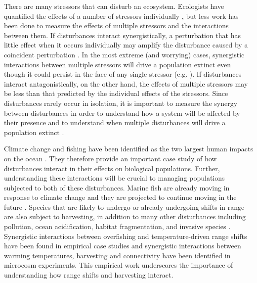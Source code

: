 \documentclass[12pt,english]{article}
\begin{document}
\begin{spacing}{1.9}
\begin{flushleft}
There are many stressors that can disturb an ecosystem. Ecologists have quantified the effects of a number of stressors individually \citep{Wilcoveetal1998, Crainetal2008, DarlingCote2008}, but less work has been done to measure the effects of multiple stressors and the interactions between them.  If disturbances interact synergistically, a perturbation that has little effect when it occurs individually may amplify the disturbance caused by a coincident perturbation \citep{Crainetal2008, DarlingCote2008,Nyeetal2013,Gurevitchetal2000}.   In the most extreme (and worrying) cases, synergistic interactions between multiple stressors will drive a population extinct even though it could persist in the face of any single stressor (e.g. \citet{Pelletieretal2006}).  If disturbances interact antagonistically, on the other hand, the effects of multiple stressors may be less than that predicted by the individual effects of the stressors.  Since disturbances rarely occur in isolation, it is important to measure the synergy between  disturbances in order to understand how a system will be affected by their presence and to understand when multiple disturbances will drive a population extinct  \citep{DoakMorris2010, Fordhametal2013, Foltetal1999}.


Climate change and fishing have been identified as the two largest human impacts on the ocean \citep{Halpernetal2008}.  They therefore provide an important case study of how disturbances interact in their effects on biological populations.  Further, understanding these interactions will be crucial to managing populations subjected to both of these disturbances.  Marine fish are already moving in response to climate change \citep{Perryetal2005, HiddinkHoftstede2008, Rijnsdorpetal2009, Dulvyetal2008, Simpsonetal2011} and they are projected to continue moving in the future \citep{Kelletal2005, Mackenzieetal2007}.  Species that are likely to undergo or already undergoing shifts in range are also subject to harvesting, in addition to many other disturbances including pollution, ocean acidification, habitat fragmentation, and invasive species \citep{Wilcoveetal1998, Salaetal2000, MEA2005, Pinskyetal2013, Barryetal1995, Nyeetal2009}.  Synergistic interactions between overfishing and temperature-driven range shifts have been found in empirical case studies \citep{Lingetal2009} and synergistic interactions between warming temperatures, harvesting and connectivity have been identified in microcosm experiments\citep{Moraetal2007}. This empirical work underscores the importance of understanding how range shifts and harvesting interact.


\end{flushleft}
\end{spacing}
\end{document}
